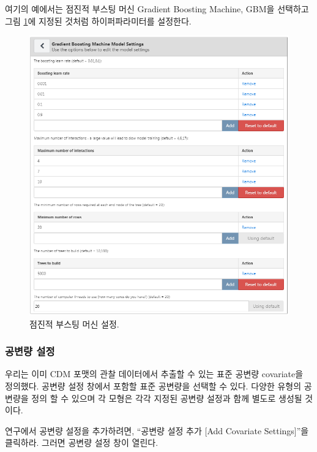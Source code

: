\documentclass[10.5pt]{book}
\theoremstyle{definition}
\theoremstyle{definition}
\theoremstyle{definition}
\theoremstyle{remark}
\begin{document}
여기의 예에서는 점진적 부스팅 머신 Gradient Boosting Machine, GBM을
선택하고 그림 \ref{fig:gbmSettings}에 지정된 것처럼 하이퍼파라미터를
설정한다.

\begin{figure}

{\centering \includegraphics[width=1\linewidth]{images/PatientLevelPrediction/gbmSettings} 

}

\caption{점진적 부스팅 머신 설정.}\label{fig:gbmSettings}
\end{figure}

\subsubsection*{공변량 설정}\label{--1}

우리는 이미 CDM 포맷의 관찰 데이터에서 추출할 수 있는 표준 공변량
covariate을 정의했다. 공변량 설정 창에서 포함할 표준 공변량을 선택할 수
있다. 다양한 유형의 공변량을 정의 할 수 있으며 각 모형은 각각 지정된
공변량 설정과 함께 별도로 생성될 것이다.

연구에서 공변량 설정을 추가하려면, ``공변량 설정 추가 {[}Add Covariate
Settings{]}''을 클릭하라. 그러면 공변량 설정 창이 열린다.
\end{document}
